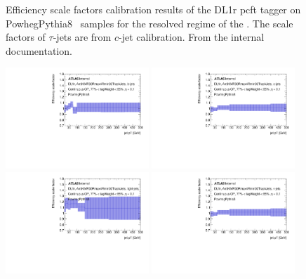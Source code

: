 \begin{figure}
    \caption{Efficiency scale factors calibration results of the DL1r \gls{pcft} tagger on PowhegPythia8 \ttb\ samples for the resolved regime of the \vhbc. The scale factors of $\tau$-jets are from $c$-jet calibration. From the internal documentation.
    }
    \label{appfig:FTAG_calibration_resolved}
\end{figure}
   
\begin{figure}
    \centering
    \includegraphics[width=0.48\textwidth]{Images/VH/Obj/FTAGCalib/ftagboo/DL1r_AntiKtVR30Rmax4Rmin02TrackJets_BTagging201903_Continuous_B_410470_77_85_eta01.pdf}
    \includegraphics[width=0.48\textwidth]{Images/VH/Obj/FTAGCalib/ftagboo/DL1r_AntiKtVR30Rmax4Rmin02TrackJets_BTagging201903_Continuous_C_410470_77_85_eta01.pdf}
    \includegraphics[width=0.48\textwidth]{Images/VH/Obj/FTAGCalib/ftagboo/DL1r_AntiKtVR30Rmax4Rmin02TrackJets_BTagging201903_Continuous_Light_410470_77_85_eta01.pdf}
    \includegraphics[width=0.48\textwidth]{Images/VH/Obj/FTAGCalib/ftagboo/DL1r_AntiKtVR30Rmax4Rmin02TrackJets_BTagging201903_Continuous_T_410470_77_85_eta01.pdf}

\end{figure}
